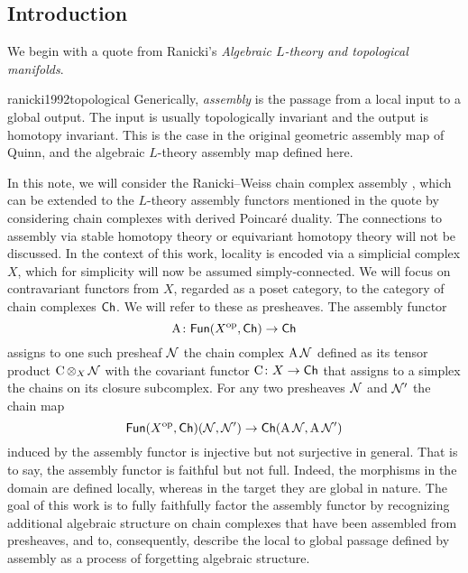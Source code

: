 
\subsection{Introduction}\label{ss:introduction}

We begin with a quote from Ranicki's \textit{Algebraic $L$-theory and topological manifolds}.
\begin{displaycquote}{ranicki1992topological}
	Generically, \textit{assembly} is the passage from a local input to a global output.
	The input is usually topologically invariant and the output is homotopy invariant.
	This is the case in the original geometric assembly map of Quinn, and the algebraic $L$-theory assembly map defined here.
\end{displaycquote}
In this note, we will consider the Ranicki--Weiss chain complex assembly \cite{ranicki1990assembly}, which can be extended to the $L$-theory assembly functors mentioned in the quote by considering chain complexes with derived Poincar\'e duality.
The connections to assembly via stable homotopy theory \cite{weiss1995asssembly} or equivariant homotopy theory \cite{davis1998assembly} will not be discussed.
In the context of this work, locality is encoded via a simplicial complex $X$, which for simplicity will now be assumed simply-connected.
We will focus on contravariant functors from $X$, regarded as a poset category, to the category of chain complexes $\mathsf{Ch}$.
We will refer to these as presheaves.
The assembly functor
\[
\operatorname{A} \colon \mathsf{Fun}(X^{\mathrm{op}}, \mathsf{Ch}) \to \mathsf{Ch}
\]
assigns to one such presheaf $\mathcal{N}$ the chain complex $\operatorname{A} \mathcal{N}$
defined
as its tensor product $\operatorname{C} \operatorname*{\otimes}_X \mathcal{N}$ with the covariant functor $\operatorname{C} \colon X \to \mathsf{Ch}$ that assigns to a simplex the chains on its closure subcomplex.
For any two presheaves $\mathcal{N}$ and $\mathcal{N}'$ the chain map
\[
\mathsf{Fun}(X^{\mathrm{op}},\mathsf{Ch})(\mathcal{N},\mathcal{N}') \to \mathsf{Ch}(\operatorname{A} \mathcal{N}, \operatorname{A} \mathcal{N}')
\]
induced by the assembly functor is injective but not surjective in general.
That is to say, the assembly functor is faithful but not full.
Indeed, the morphisms in the domain are defined locally, whereas in the target they are global in nature.
The goal of this work is to fully faithfully factor the assembly functor by recognizing additional algebraic structure on chain complexes that have been assembled from presheaves, and to, consequently, describe the local to global passage defined by assembly as a process of forgetting algebraic structure.
